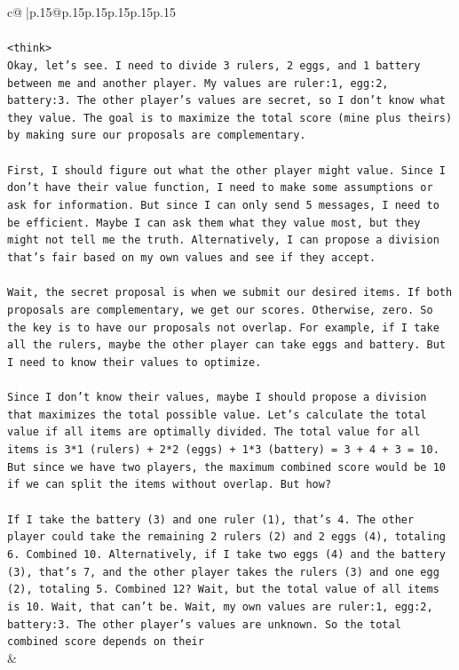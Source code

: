 \documentclass{article}
\begin{document}
{\begin{supertabular}{c@{$\;$}|p{.15\linewidth}@{}p{.15\linewidth}p{.15\linewidth}p{.15\linewidth}p{.15\linewidth}p{.15\linewidth}}
{{{\\ 
\\ 
\texttt{<think>} \\
\texttt{Okay, let's see. I need to divide 3 rulers, 2 eggs, and 1 battery between me and another player. My values are ruler:1, egg:2, battery:3. The other player's values are secret, so I don't know what they value. The goal is to maximize the total score (mine plus theirs) by making sure our proposals are complementary.} \\
\\ 
\texttt{First, I should figure out what the other player might value. Since I don't have their value function, I need to make some assumptions or ask for information. But since I can only send 5 messages, I need to be efficient. Maybe I can ask them what they value most, but they might not tell me the truth. Alternatively, I can propose a division that's fair based on my own values and see if they accept.} \\
\\ 
\texttt{Wait, the secret proposal is when we submit our desired items. If both proposals are complementary, we get our scores. Otherwise, zero. So the key is to have our proposals not overlap. For example, if I take all the rulers, maybe the other player can take eggs and battery. But I need to know their values to optimize.} \\
\\ 
\texttt{Since I don't know their values, maybe I should propose a division that maximizes the total possible value. Let's calculate the total value if all items are optimally divided. The total value for all items is 3*1 (rulers) + 2*2 (eggs) + 1*3 (battery) = 3 + 4 + 3 = 10. But since we have two players, the maximum combined score would be 10 if we can split the items without overlap. But how?} \\
\\ 
\texttt{If I take the battery (3) and one ruler (1), that's 4. The other player could take the remaining 2 rulers (2) and 2 eggs (4), totaling 6. Combined 10. Alternatively, if I take two eggs (4) and the battery (3), that's 7, and the other player takes the rulers (3) and one egg (2), totaling 5. Combined 12? Wait, but the total value of all items is 10. Wait, that can't be. Wait, my own values are ruler:1, egg:2, battery:3. The other player's values are unknown. So the total combined score depends on their} \\
            }
        }
    }
    & \\ \\


\end{supertabular}}
\end{document}
